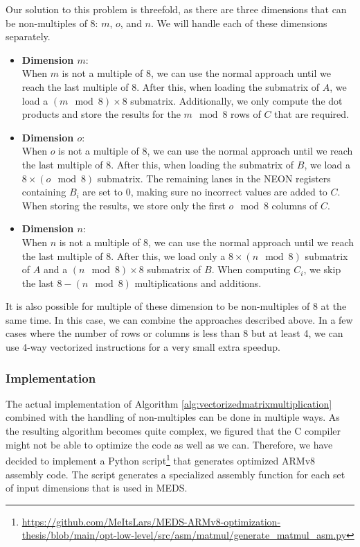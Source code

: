 \documentclass[11pt,a4paper]{report}
\theoremstyle{definition}
\begin{document}
Our solution to this problem is threefold, as there are three dimensions that can be non-multiples of 8: $m$, $o$, and $n$. We will handle each of these dimensions separately.
\begin{itemize}
  \item \textbf{Dimension $m$}:\\
  When $m$ is not a multiple of 8, we can use the normal approach until we reach the last multiple of 8. After this, when loading the submatrix of $A$, we load a $(m \mod 8) \times 8$ submatrix. Additionally, we only compute the dot products and store the results for the $m \mod 8$ rows of $C$ that are required.
  \item \textbf{Dimension $o$}:\\
  When $o$ is not a multiple of 8, we can use the normal approach until we reach the last multiple of 8. After this, when loading the submatrix of $B$, we load a $8 \times (o \mod 8)$ submatrix. The remaining lanes in the NEON registers containing $B_i$ are set to 0, making sure no incorrect values are added to $C$. When storing the results, we store only the first $o \mod 8$ columns of $C$.
  \item \textbf{Dimension $n$}:\\
  When $n$ is not a multiple of 8, we can use the normal approach until we reach the last multiple of 8. After this, we load only a $8 \times (n \mod 8)$ submatrix of $A$ and a $(n \mod 8) \times 8$ submatrix of $B$. When computing $C_i$, we skip the last $8 - (n \mod 8)$ multiplications and additions.
\end{itemize}
It is also possible for multiple of these dimension to be non-multiples of 8 at the same time. In this case, we can combine the approaches described above. In a few cases where the number of rows or columns is less than 8 but at least 4, we can use 4-way vectorized instructions for a very small extra speedup.

\subsubsection{Implementation}
The actual implementation of Algorithm \ref{alg:vectorizedmatrixmultiplication} combined with the handling of non-multiples can be done in multiple ways. As the resulting algorithm becomes quite complex, we figured that the C compiler might not be able to optimize the code as well as we can. Therefore, we have decided to implement a Python script\footnote{\url{https://github.com/MeItsLars/MEDS-ARMv8-optimization-thesis/blob/main/opt-low-level/src/asm/matmul/generate\_matmul\_asm.py}} that generates optimized ARMv8 assembly code. The script generates a specialized assembly function for each set of input dimensions that is used in MEDS.
\end{document}
